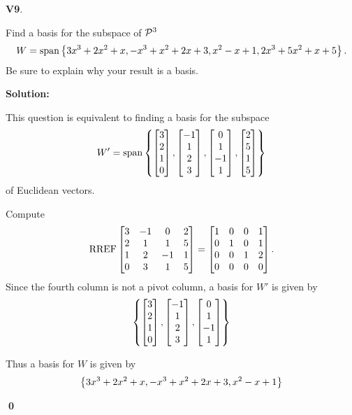 \documentclass{article}
\newenvironment{problem}[1]
{
  \begin{flushleft}
  \textbf{#1}.
  \ignorespaces
}
{
  \end{flushleft}
}
\newenvironment{solution}
{
  \ignorespaces
  \textbf{Solution:}
}
{
  \ignorespacesafterend
  \begin{flushright}
  {\bfseries \qed}
  \end{flushright}
}
\begin{document}
\begin{problem}{V9}
Find a basis for the subspace of \(\P^3\)
\[W=\vspan\setList{3x^3+2x^2+x,-x^3+x^2+2x+3,x^2-x+1,2x^3+5x^2+x+5}.\]
Be sure to explain why your result is a basis.
\end{problem}
\begin{solution}
This question is equivalent to finding a basis for the subspace
\[
  W' = \vspan \setList{
  \begin{bmatrix} 3\\2\\1\\0\end{bmatrix},
  \begin{bmatrix} -1\\1\\2\\3\end{bmatrix},
  \begin{bmatrix} 0\\1\\-1\\1\end{bmatrix},
  \begin{bmatrix} 2\\5\\1\\5\end{bmatrix}
  }
\]
of Euclidean vectors.

Compute
\[\RREF \begin{bmatrix} 3 & -1 & 0 & 2 \\ 2 & 1 & 1 & 5 \\ 1 & 2 & -1 & 1 \\ 0 & 3 & 1 & 5 \end{bmatrix} =
\begin{bmatrix} 1 & 0 & 0 & 1 \\ 0 & 1 & 0 & 1 \\ 0 & 0 & 1 & 2 \\ 0 & 0 & 0 & 0 \end{bmatrix}.\]
Since the fourth column is not a pivot column, a basis for \(W'\) is given by
\[
  \setList{
  \begin{bmatrix} 3\\2\\1\\0\end{bmatrix},
  \begin{bmatrix} -1\\1\\2\\3\end{bmatrix},
  \begin{bmatrix} 0\\1\\-1\\1\end{bmatrix}
  }
\]

Thus a basis for \(W\) is given by
\[
  \setList{3x^3+2x^2+x,-x^3+x^2+2x+3,x^2-x+1}
\]
\end{solution}
\end{document}
